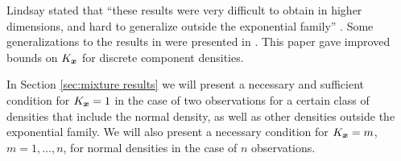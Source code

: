 	Lindsay stated that ``these results were very difficult to obtain in higher dimensions, and hard to generalize outside the exponential family'' \cite{Lindsay1995-sq}. Some generalizations to the results in \cite{Lindsay1983a-he} were presented in \cite{Lindsay1993-rj}. This paper gave improved bounds on $K_{\bm{{x}}}$ for discrete component densities.

	In Section \ref{sec:mixture results} we will present a necessary and sufficient condition for $K_{\bm{{x}}} = 1$ in the case of two observations for a certain class of densities that include the normal density, as well as other densities outside the exponential family. We will also present a necessary condition for $K_{\bm{{x}}} = m$, $m = 1, \dots, n$, for normal densities in the case of $n$ observations.



	




